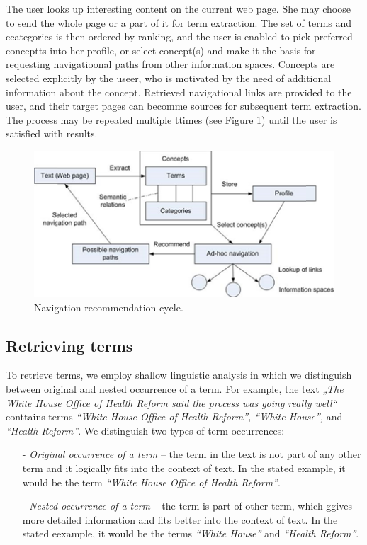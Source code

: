 \documentclass{llncs}%
\begin{document}
The user looks up interesting content on the current web page. She may choose to send the whole page or a part of it for term extraction. The set of terms and ccategories is then ordered by ranking, and the user is enabled to pick preferred conceptts into her profile, or select concept(s) and make it the basis for requesting navigatioonal paths from other information spaces. Concepts are selected explicitly by the useer, who is motivated by the need of additional information about the concept. Retrieved navigational links are provided to the user, and their target pages can becomme sources for subsequent term extraction. The process may be repeated multiple ttimes (see Figure \ref{fig2}) until the user is satisfied with results. 

\begin{figure}[ht]
\centering
\includegraphics[width =\textwidth]{Images/obr2.png}
\caption{Navigation recommendation cycle. }
\label{fig2}
\end{figure}

\subsection{Retrieving terms}
To retrieve terms, we employ shallow linguistic analysis in which we distinguish between original and nested occurrence of a term. For example, the text \textit{„The White House Office of Health Reform said the process was going really well“} conttains terms \textit{“White House Office of Health Reform”, “White House”,} and \textit{“Health Reform”}. We distinguish two types of term occurrences: 
\begin{itemize}%
\item [-] \textit{Original occurrence of a term} – the term in the text is not part of any other term and it logically fits into the context of text. In the stated example, it would be the term \textit{“White House Office of Health Reform”}. 
\item [-] \textit{Nested occurrence of a term} – the term is part of other term, which ggives more detailed information and fits better into the context of text. In the stated eexample, it would be the terms \textit{“White House”} and \textit{“Health Reform”}. 
\end{itemize}
\end{document}
